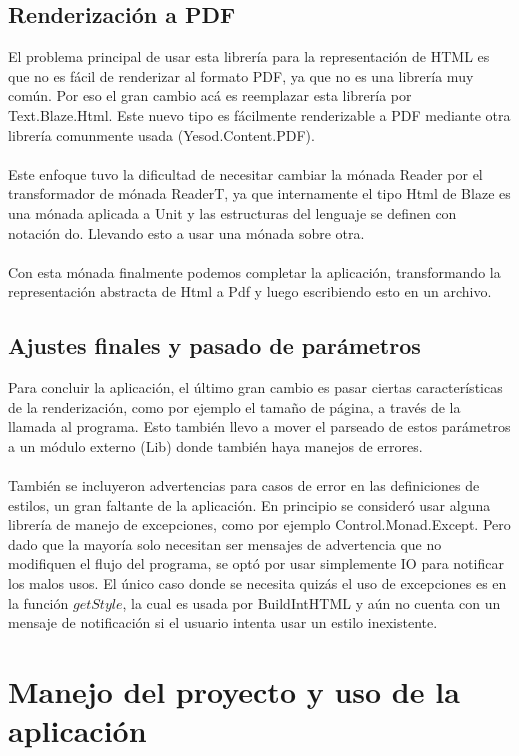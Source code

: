 \documentclass{article}
\begin{document}
\subsection{Renderización a PDF}

El problema principal de usar esta librería para la representación de HTML es que no es fácil de renderizar al formato PDF, ya que no es una librería muy común. Por eso el gran cambio acá es reemplazar esta librería por Text.Blaze.Html. Este nuevo tipo es fácilmente renderizable a PDF mediante otra librería comunmente usada (Yesod.Content.PDF).
\\~\\
Este enfoque tuvo la dificultad de necesitar cambiar la mónada Reader por el transformador de mónada ReaderT, ya que internamente el tipo Html de Blaze es una mónada aplicada a Unit y las estructuras del lenguaje se definen con notación do. Llevando esto a usar una mónada sobre otra.
\\~\\
Con esta mónada finalmente podemos completar la aplicación, transformando la representación abstracta de Html a Pdf y luego escribiendo esto en un archivo.

\subsection{Ajustes finales y pasado de parámetros}

Para concluir la aplicación, el último gran cambio es pasar ciertas características de la renderización, como por ejemplo el tamaño de página, a través de la llamada al programa. Esto también llevo a mover el parseado de estos parámetros a un módulo externo (Lib) donde también haya manejos de errores.
\\~\\
También se incluyeron advertencias para casos de error en las definiciones de estilos, un gran faltante de la aplicación. En principio se consideró usar alguna librería de manejo de excepciones, como por ejemplo Control.Monad.Except. Pero dado que la mayoría solo necesitan ser mensajes de advertencia que no modifiquen el flujo del programa, se optó por usar simplemente IO para notificar los malos usos. El único caso donde se necesita quizás el uso de excepciones es en la función $getStyle$, la cual es usada por BuildIntHTML y aún no cuenta con un mensaje de notificación si el usuario intenta usar un estilo inexistente.

\section{Manejo del proyecto y uso de la aplicación}
\end{document}
